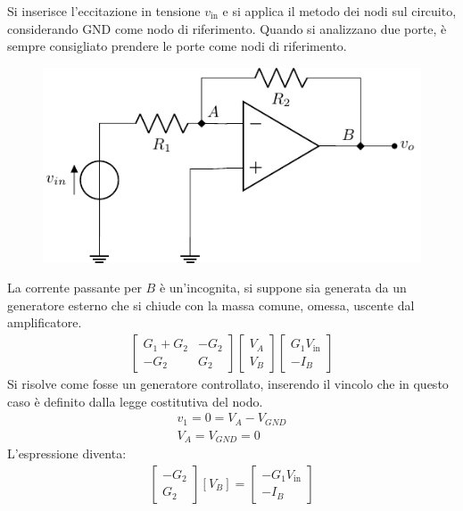 \documentclass{article}
\numberwithin{equation}{subsection}
\begin{document}
Si inserisce l'eccitazione in tensione $v_\mathrm{in}$ e si applica il metodo dei nodi sul circuito, considerando GND come 
nodo di riferimento. Quando si analizzano due porte, è sempre 
consigliato prendere le porte come nodi di riferimento. 
\begin{figure}[H]%
    \centering
    \includegraphics{amplificazione-invertente.pdf}%
    \label{fig:amplificazione-invertente}
\end{figure}
La corrente passante per $B$ è un'incognita, si suppone sia generata da un generatore esterno che si chiude con la massa comune, omessa, uscente dal 
amplificatore. 
\begin{gather*}
    \begin{bmatrix}
        G_1+G_2&-G_2\\-G_2&G_2
    \end{bmatrix}\begin{bmatrix}
        V_A\\V_B
    \end{bmatrix}\begin{bmatrix}
        G_1V_\mathrm{in}\\
        -I_B
    \end{bmatrix}
\end{gather*}
Si risolve come fosse un generatore controllato, inserendo il vincolo che in questo caso è definito dalla legge costitutiva del nodo. 
\begin{gather*}
    v_1=0=V_A-V_{GND}\\
    V_A=V_{{GND}}=0
\end{gather*}
L'espressione diventa:
\begin{gather*}
    \begin{bmatrix}
        -G_2\\G_2
    \end{bmatrix}[V_B]=\begin{bmatrix}
        -G_1V_\mathrm{in}\\-I_B
    \end{bmatrix}
\end{gather*}
\end{document}
